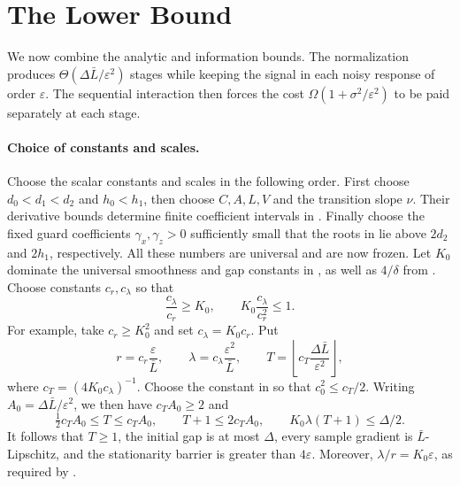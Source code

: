 \documentclass[11pt]{article}
\newcommand{\eps}{\varepsilon}
\newcommand{\Lb}{\bar L}
\theoremstyle{definition}
\theoremstyle{remark}
\begin{document}
\section{The Lower Bound}\label{sec:lower}

We now combine the analytic and information bounds.  The normalization
produces $\Theta(\Delta\Lb/\eps^2)$ stages while keeping the signal in each
noisy response of order $\eps$.  The sequential interaction then forces the
cost $\Omega(1+\sigma^2/\eps^2)$ to be paid separately at each stage.

\paragraph{Choice of constants and scales.}
Choose the scalar constants and scales in the following order.  First
choose $d_0<d_1<d_2$ and $h_0<h_1$, then choose $C,A,L,V$ and the transition
slope $\nu$.  Their derivative bounds determine finite coefficient
intervals in .  Finally choose the fixed
guard coefficients $\gamma_x,\gamma_z>0$ sufficiently small that the roots in
 lie above $2d_2$ and $2h_1$, respectively.
All these numbers are universal and are now frozen.  Let $K_0$ dominate the universal
smoothness and gap constants in , as well as $4/\delta$ from
.  Choose constants $c_r,c_\lambda$ so that
\begin{equation}\label{eq:constant-hierarchy}
 \frac{c_\lambda}{c_r}\ge K_0,
 \qquad
 K_0\frac{c_\lambda}{c_r^2}\le1.
\end{equation}
For example, take $c_r\ge K_0^2$ and set $c_\lambda=K_0c_r$.
Put
\begin{equation}\label{eq:scales}
 r=c_r\frac{\eps}{\Lb},
 \qquad
 \lambda=c_\lambda\frac{\eps^2}{\Lb},
 \qquad
 T=\left\lfloor c_T\frac{\Delta\Lb}{\eps^2}\right\rfloor,
\end{equation}
where $c_T=(4K_0c_\lambda)^{-1}$. Choose the constant in  so that $c_0^2\le c_T/2$. Writing $A_0=\Delta\Lb/\eps^2$, we then have $c_TA_0\ge2$ and
\[
 \tfrac12c_TA_0\le T\le c_TA_0,
 \qquad T+1\le2c_TA_0,
 \qquad K_0\lambda(T+1)\le\Delta/2.
\]
It follows that $T\ge1$, the initial gap is at most $\Delta$, every sample
gradient is $\Lb$-Lipschitz, and the stationarity barrier is greater than
$4\eps$.  Moreover, $\lambda/r=K_0\eps$, as required by
.
\end{document}
